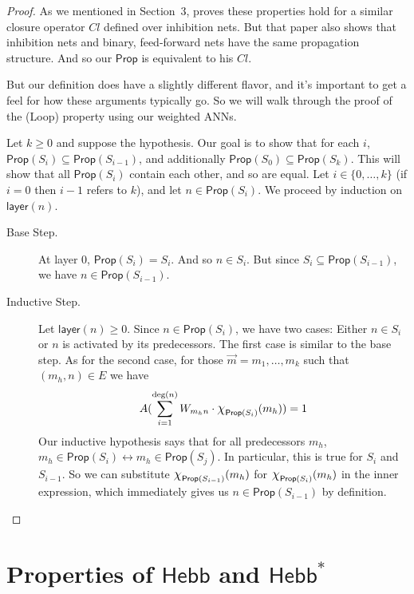 \documentclass[letterpaper]{article}
\theoremstyle{definition}
\newcommand{\set}[1]{\{ #1 \}}
\newcommand*{\bigchi}{\mbox{\Large$\chi$}}%
\newcommand{\degree}[1]{\mathrm{deg}(#1)}
\newcommand{\layer}[1]{\mathsf{layer}(#1)}
\newcommand{\Prop}{\mathsf{Prop}}
\newcommand{\HebbNoArgs}{\mathsf{Hebb}}
\newcommand{\HebbstarNoArgs}{\mathsf{Hebb}^*}
\begin{document}
\propagationproperties*
\begin{proof}
As we mentioned in Section~3, \cite{leitgeb2001nonmonotonic} proves these properties hold for a similar closure operator $Cl$ defined over inhibition nets.  But that paper also shows that inhibition nets and binary, feed-forward nets have the same propagation structure.  And so our $\Prop$ is equivalent to his $Cl$.

But our definition does have a slightly different flavor, and it's important to get a feel for how these arguments typically go.  So we will walk through the proof of the (Loop) property using our weighted ANNs.

Let $k \geq 0$ and suppose the hypothesis.  Our goal is to show that for each $i$, $\Prop(S_i) \subseteq \Prop(S_{i-1})$, and additionally $\Prop(S_0) \subseteq \Prop(S_k)$.  This will show that all $\Prop(S_i)$ contain each other, and so are equal.  Let $i \in \set{0, \ldots, k}$ (if $i = 0$ then $i-1$ refers to $k$), and let $n \in \Prop(S_i)$.  We proceed by induction on $\layer{n}$.

\begin{description}
\item[Base Step.] At layer $0$, $\Prop(S_i) = S_i$. And so $n \in S_i$. But since $S_i \subseteq \Prop(S_{i-1})$, we have $n \in \Prop(S_{i-1})$.

\item[Inductive Step.] Let $\layer{n} \geq 0$. Since $n \in \Prop(S_i)$, we have two cases: Either $n \in S_i$ or $n$ is activated by its predecessors.  The first case is similar to the base step.  As for the second case, for those $\vec{m} = m_1, \ldots, m_k$ such that $(m_h, n) \in E$ we have
\[
    A(\sum_{i=1}^{\degree{n}} W_{m_h n} \cdot \bigchi_{\Prop(S_i)}(m_h)) = 1
\]
Our inductive hypothesis says that for all predecessors $m_h$, $m_h \in \Prop(S_i) \leftrightarrow m_h \in \Prop(S_j)$.  In particular, this is true for $S_i$ and $S_{i-1}$.  So we can substitute $\bigchi_{\Prop(S_{i-1})}(m_h)$ for $\bigchi_{\Prop(S_i)}(m_h)$ in the inner expression, which immediately gives us $n \in \Prop(S_{i-1})$ by definition.\qedhere
\end{description}
\end{proof}

\section{Properties of $\HebbNoArgs$ and $\HebbstarNoArgs$}
\end{document}
